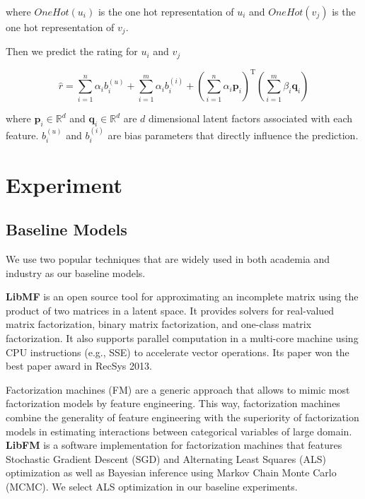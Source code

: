 \documentclass{sig-alternate-05-2015}
\begin{document}
where $OneHot(u_i)$ is the one hot representation of $u_i$
and $OneHot(v_j)$ is the one hot representation of $v_j$.

Then we predict the rating for $u_i$ and $v_j$

\begin{equation}
\hat{r} = \sum_{i=1}^{n} \alpha_{i} b_{i}^{(u)} + \sum_{i=1}^{m} \alpha_{i} b_{i}^{(i)} +
\left( \sum_{i=1}^{n} \alpha_{i} \textbf{p}_{i} \right) ^ \mathrm{T}
\left( \sum_{i=1}^{m} \beta_{i} \textbf{q}_{i} \right)
\end{equation}

where $\textbf{p}_{i} \in \mathbb{R}^d$ and $\textbf{q}_{i} \in \mathbb{R}^d$
are $d$ dimensional latent factors associated with each feature.
$b_{i}^{(u)}$ and $b_{i}^{(i)}$ are bias parameters that directly influence the prediction.


\section{Experiment}

\subsection{Baseline Models}
We use two popular techniques that are widely used
in both academia and industry as our baseline models.

\textbf{LibMF} is an open source tool
for approximating an incomplete matrix using the product of
two matrices in a latent space.
It provides solvers for real-valued matrix factorization,
binary matrix factorization, and one-class matrix factorization.
It also supports parallel computation in a multi-core machine
using CPU instructions (e.g., SSE) to accelerate vector operations.
Its paper \cite{chin2015fast} won the best paper award
in RecSys 2013.

Factorization machines (FM) are a generic approach that
allows to mimic most factorization models by feature engineering.
This way, factorization machines combine the generality of
feature engineering with the superiority of factorization models
in estimating interactions between categorical variables of large domain.
\textbf{LibFM} \cite{rendle2012factorization} is a software implementation
for factorization machines that features
Stochastic Gradient Descent (SGD) and
Alternating Least Squares (ALS) optimization as well as
Bayesian inference using Markov Chain Monte Carlo (MCMC).
We select ALS optimization in our baseline experiments.
\end{document}
